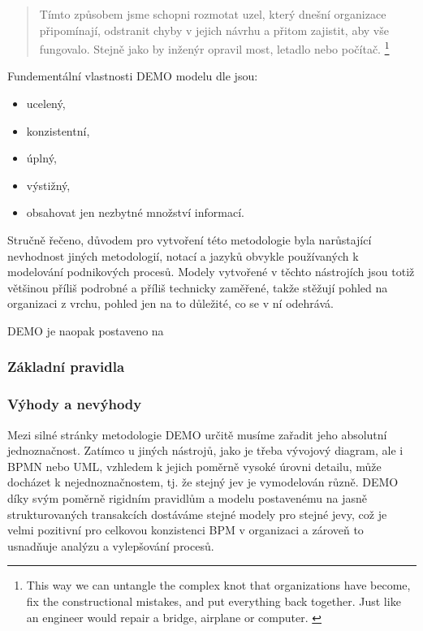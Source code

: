 \documentclass[]{article}
\begin{document}
\begin{quote}
Tímto způsobem jsme schopni rozmotat uzel,  který dnešní organizace připomínají, odstranit chyby v jejich návrhu a přitom zajistit, aby vše fungovalo. Stejně jako by inženýr opravil most, letadlo nebo počítač. \cite{DEMO_web}
\footnote{This way we can untangle the complex knot that organizations have become, fix the constructional mistakes, and put everything back together. Just like an engineer would repair a bridge, airplane or computer. \cite{DEMO_web}}
\end{quote}

Fundementální vlastnosti DEMO modelu dle \cite{Dietz2006} jsou:

\begin{itemize}
\item ucelený,
\item konzistentní,
\item úplný,
\item výstižný,
\item obsahovat jen nezbytné množství informací.
\end{itemize}

Stručně řečeno, důvodem pro vytvoření této metodologie byla narůstající nevhodnost jiných metodologií, notací a jazyků obvykle používaných k modelování podnikových procesů. Modely vytvořené v těchto nástrojích jsou totiž většinou příliš podrobné a příliš technicky zaměřené, takže stěžují pohled na organizaci z vrchu, pohled jen na to důležité, co se v ní odehrává.

DEMO je naopak postaveno na 

\subsubsection{Základní pravidla}

\subsubsection{Výhody a nevýhody}
Mezi silné stránky metodologie DEMO určitě musíme zařadit jeho absolutní jednoznačnost. Zatímco u jiných nástrojů, jako je třeba vývojový diagram, ale i BPMN nebo UML, vzhledem k jejich poměrně vysoké úrovni detailu, může docházet k nejednoznačnostem, tj. že stejný jev je vymodelován různě. DEMO díky svým poměrně rigidním pravidlům a modelu postavenému na jasně strukturovaných transakcích dostáváme stejné modely pro stejné jevy, což je velmi pozitivní pro celkovou konzistenci BPM v organizaci a zároveň to usnadňuje analýzu a vylepšování procesů.
\end{document}
